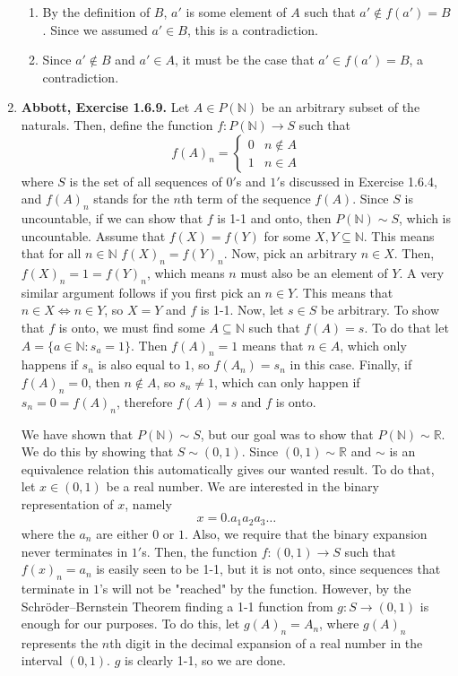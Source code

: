 \documentclass{article}
\newcommand{\N}{\mathbb{N}}
\newcommand{\R}{\mathbb{R}}
\newcommand{\exc}[2][Abbott]{\item \textbf{#1, Exercise #2.}}
\begin{document}
\begin{enumerate}
	\begin{enumerate}
		\item By the definition of $B$, $a'$ is some element of $A$ such that $a' \notin f(a') = B$. Since we assumed $a' \in B$, this is a contradiction.
		      		      		      	      	      	      	              
		\item Since $a' \notin B$ and $a' \in A$, it must be the case that $a' \in f(a') = B$, a contradiction.
	\end{enumerate}
				      	          
	\exc{1.6.9}
	Let $A \in P(\N)$ be an arbitrary subset of the naturals. Then, define the function $f : P(\N) \rightarrow S$ such that
	\begin{equation*}
		f(A)_n = \begin{cases}
		0 & n \notin A \\
		1 & n \in A
		\end{cases}
	\end{equation*}
	where $S$ is the set of all sequences of $0'$s and $1'$s discussed in Exercise 1.6.4, and $f(A)_n$ stands for the $n$th term of the sequence $f(A)$. Since $S$ is uncountable, if we can show that $f$ is 1-1 and onto, then $P(\N) \sim S$, which is uncountable. Assume that $f(X) = f(Y)$ for some $X, Y \subseteq \N$. This means that for all $n \in \N$ $f(X)_n = f(Y)_n$. Now, pick an arbitrary $n \in X$. Then, $f(X)_n = 1 = f(Y)_n$, which means $n$ must also be an element of $Y$. A very similar argument follows if you first pick an $n \in Y$. This means that $n \in X \iff n \in Y$, so $X = Y$ and $f$ is 1-1. Now, let $s \in S$ be arbitrary. To show that $f$ is onto, we must find some $A \subseteq \N$ such that $f(A) = s$. To do that let $A = \{a \in \N:s_a = 1\}$. Then $f(A)_n = 1$ means that $n \in A$, which only happens if $s_n$ is also equal to $1$, so $f(A_n) = s_n$ in this case. Finally, if $f(A)_n = 0$, then $n \notin A$, so $s_n \neq 1$, which can only happen if $s_n = 0 = f(A)_n$, therefore $f(A) = s$ and $f$ is onto. 
				      	          
	We have shown that $P(\N) \sim S$, but our goal was to show that $P(\N) \sim \R$. We do this by showing that $S \sim (0, 1)$. Since $(0, 1) \sim \R$ and $\sim$ is an equivalence relation this automatically gives our wanted result. To do that, let $x \in (0, 1)$ be a real number. We are interested in the binary representation of $x$, namely \begin{equation*}
	x = 0.a_1 a_2 a_3 \dots
	\end{equation*}
	where the $a_n$ are either $0$ or $1$. Also, we require that the binary expansion never terminates in $1'$s. Then, the function $f : (0, 1) \rightarrow S$ such that $f(x)_n = a_n$ is easily seen to be 1-1, but it is not onto, since sequences that terminate in $1$'s will not be "reached" by the function. However, by the Schröder–Bernstein Theorem finding a 1-1 function from $g : S \rightarrow (0, 1)$ is enough for our purposes. To do this, let $g(A)_n = A_n$, where $g(A)_n$ represents the $n$th digit in the decimal expansion of a real number in the interval $(0, 1)$. $g$ is clearly 1-1, so we are done.
					    

\end{enumerate}
\end{document}
